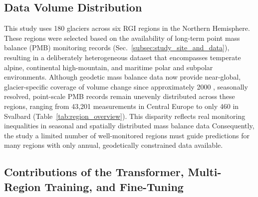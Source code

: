 \documentclass[draft]{agujournal2019}
\begin{document}
\subsection{Data Volume Distribution}\label{disc:data-asymmetry}

This study uses 180 glaciers across six RGI regions in the Northern Hemisphere. These regions were selected based on the availability of long-term point mass balance (PMB) monitoring records (Sec.~\ref{subsec:study_site_and_data}), resulting in a deliberately heterogeneous dataset that encompasses temperate alpine, continental high-mountain, and maritime polar and subpolar environments. Although geodetic mass balance data now provide near-global, glacier-specific coverage of volume change since approximately 2000 \citep[e.g.,][]{Dussaillant_2019, Hugonnet_2021, Berthier_2023, GlaMBIE_2025}, seasonally resolved, point-scale PMB records remain unevenly distributed across these regions, ranging from 43,201 measurements in Central Europe to only 460 in Svalbard (Table~\ref{tab:region_overview}). This disparity reflects real monitoring inequalities in seasonal and spatially distributed mass balance data Consequently, the study  a limited number of well-monitored regions must guide predictions for many regions with only annual, geodetically constrained data available.





\subsection{Contributions of the Transformer, Multi-Region Training, and Fine-Tuning}
\end{document}
